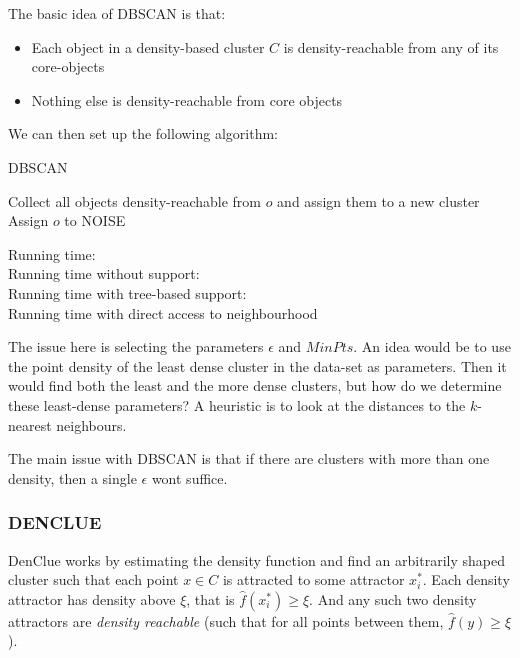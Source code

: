     The basic idea of DBSCAN is that:
    \begin{itemize}
        \item Each object in a density-based cluster $C$ is density-reachable 
        from any of its core-objects
        \item Nothing else is density-reachable from core objects
    \end{itemize}
    We can then set up the following algorithm:
    \begin{algorithm}
        \caption{DBSCAN}
        \begin{algorithmic}
                        \State Collect all objects density-reachable from $o$ 
                        and assign them to a new cluster
                    \Else
                        \State Assign $o$ to NOISE
                    \EndIf
                \EndIf
            \EndFor
        \end{algorithmic}
        Running time: \\
        Running time without support: \\
        Running time with tree-based support: \\
        Running time with direct access to neighbourhood 
    \end{algorithm}
    
    The issue here is selecting the parameters $\epsilon$ and $MinPts$. An idea 
    would be to use the point density of the least dense cluster in the 
    data-set as parameters. Then it would find both the least and the more 
    dense clusters, but how do we determine these least-dense parameters? A 
    heuristic is to look at the distances to the $k$-nearest neighbours.
    
    The main issue with DBSCAN is that if there are clusters with more than one 
    density, then a single $\epsilon$ wont suffice.
    
    \subsubsection{DENCLUE}
    DenClue works by estimating the density function and find an arbitrarily 
    shaped cluster such that each point $x \in C$ is attracted to some 
    attractor $x_i^*$. Each density attractor has density above $\xi$, that is 
    $\hat{f}(x_i^*) \geq \xi$. And any such two density attractors are 
    \textit{density reachable} (such that for all points between them, 
    $\hat{f}(y) \geq \xi$).
    
